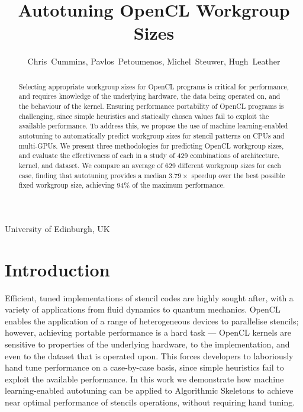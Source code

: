\documentclass[hidelinks]{acaces}
\begin{document}
\title{Autotuning OpenCL Workgroup Sizes}

\author{
Chris~Cummins,
Pavlos~Petoumenos,
Michel~Steuwer,
Hugh~Leather
}

\address{1}{
University of Edinburgh,
UK
}

%

\pagestyle{empty}


\begin{abstract}
  Selecting appropriate workgroup sizes for OpenCL programs is
  critical for performance, and requires knowledge of the underlying
  hardware, the data being operated on, and the behaviour of the
  kernel. Ensuring performance portability of OpenCL programs is
  challenging, since simple heuristics and statically chosen values
  fail to exploit the available performance. To address this, we
  propose the use of machine learning-enabled autotuning to
  automatically predict workgroup sizes for stencil patterns on CPUs
  and multi-GPUs. We present three methodologies for predicting OpenCL
  workgroup sizes, and evaluate the effectiveness of each in a study
  of 429 combinations of architecture, kernel, and dataset. We compare
  an average of 629 different workgroup sizes for each case, finding
  that autotuning provides a median $3.79\times$ speedup over the best
  possible fixed workgroup size, achieving 94\% of the maximum
  performance.
\end{abstract}

\vspace{-.5em}

\vspace{-2em}
\section{Introduction}

Efficient, tuned implementations of stencil codes are highly sought
after, with a variety of applications from fluid dynamics to quantum
mechanics. OpenCL enables the application of a range of heterogeneous
devices to parallelise stencils; however, achieving portable
performance is a hard task --- OpenCL kernels are sensitive to
properties of the underlying hardware, to the implementation, and even
to the dataset that is operated upon. This forces developers to
laboriously hand tune performance on a case-by-case basis, since
simple heuristics fail to exploit the available performance. In this
work we demonstrate how machine learning-enabled autotuning can be
applied to Algorithmic Skeletons to achieve near optimal performance
of stencils operations, without requiring hand tuning.
\end{document}
